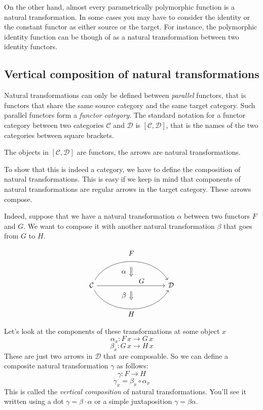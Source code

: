 \documentclass[DaoFP]{subfiles}
\begin{document}
On the other hand, almost every parametrically polymorphic function is a natural transformation. In some cases you may have to consider the identity or the constant functor as either source or the target. For instance, the polymorphic identity function can be though of as a natural transformation between two identity functors.

\subsection{Vertical composition of natural transformations}

Natural transformations can only be defined between \emph{parallel} functors, that is functors that share the same source category and the same target category. Such parallel functors form a \emph{functor category}. The standard notation for a functor category between two categories $\mathcal{C}$ and $\mathcal{D}$ is $[\mathcal{C}, \mathcal{D}]$, that is the names of the two categories between square brackets.

The objects in $[\mathcal{C}, \mathcal{D}]$ are functors, the arrows are natural transformations. 

To show that this is indeed a category, we have to define the composition of natural transformations. This is easy if we keep in mind that components of natural transformations are regular arrows in the target category. These arrows compose.

Indeed, suppose that we have a natural transformation $\alpha$ between two functors $F$ and $G$. We want to compose it with another natural transformation $\beta$ that goes from $G$ to $H$. 

\[
\begin{tikzcd}[column sep=huge]
\mathcal{C}
  \arrow[bend left=60]{rr}[name=U, label=above:$F$]{}
  \arrow[]{rr}[name=M, label={[xshift=15pt, yshift=-5pt]:$G$}]{} 
  \arrow[bend right=60]{rr}[name=D, label=below:$H$]{} 
 &&
\mathcal{D}
  \arrow[shorten <=8pt, shorten >=8pt,Rightarrow, to path={(U) -- node[label=left:$\alpha$] {} (M)}]{}
  \arrow[shorten <=8pt, shorten >=8pt,Rightarrow, to path={(M) -- node[label=left:$\beta$] {} (D)}]{}
\end{tikzcd}
\]


Let's look at the components of these transformations at some object $x$
\[ \alpha_x \colon F \, x \to G \, x \]
\[ \beta_x \colon G \, x \to H \, x \]
These are just two arrows in $\mathcal{D}$ that are composable. So we can define a composite natural transformation $\gamma$ as follows:
\[ \gamma \colon F \to H\]
\[ \gamma_x = \beta_x \circ \alpha_x \]
 This is called the \emph{vertical composition} of natural transformations. You'll see it written using a dot $\gamma = \beta \cdot \alpha$ or a simple juxtaposition $\gamma = \beta \alpha$.
 
\end{document}
